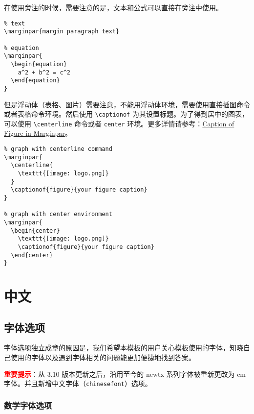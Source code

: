 \documentclass[cn,11pt]{elegantbook}
\begin{document}
\begin{remark}
在使用旁注的时候，需要注意的是，文本和公式可以直接在旁注中使用。

\begin{lstlisting}
% text
\marginpar{margin paragraph text}

% equation
\marginpar{
  \begin{equation}
    a^2 + b^2 = c^2
  \end{equation}
}
\end{lstlisting}

但是浮动体（表格、图片）需要注意，不能用浮动体环境，需要使用直接插图命令或者表格命令环境。然后使用 \lstinline{\captionof} 为其设置标题。为了得到居中的图表，可以使用 \lstinline{\centerline} 命令或者 \lstinline{center} 环境。更多详情请参考：\href{https://tex.stackexchange.com/questions/5583/caption-of-figure-in-marginpar-and-caption-of-wrapfigure-in-margin}{Caption of Figure in Marginpar}。

\begin{lstlisting}
% graph with centerline command
\marginpar{
  \centerline{
    \texttt{[image: logo.png]}
  }
  \captionof{figure}{your figure caption}
}

% graph with center environment
\marginpar{
  \begin{center}
    \texttt{[image: logo.png]}
    \captionof{figure}{your figure caption}
  \end{center}
}
\end{lstlisting}

\end{remark}

\part{中文}

\chapter{字体选项}
字体选项独立成章的原因是，我们希望本模板的用户关心模板使用的字体，知晓自己使用的字体以及遇到字体相关的问题能更加便捷地找到答案。

\textcolor{red}{\bfseries 重要提示}：从 3.10 版本更新之后，沿用至今的 newtx 系列字体被重新更改为 cm 字体。并且新增中文字体（\lstinline{chinesefont}）选项。

\section{数学字体选项}
\end{document}
